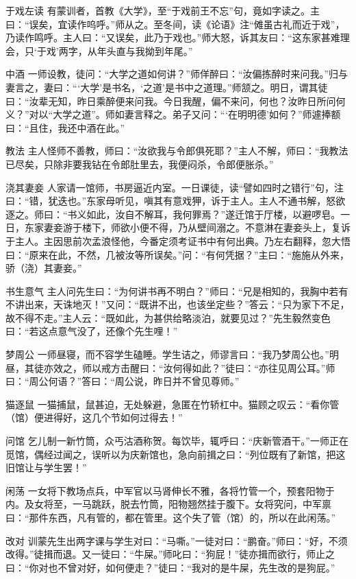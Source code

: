 \documentclass[12pt,UTF8]{ctexbook}
\begin{document}
于戏左读
有蒙训者，首教《大学》，至“于戏前王不忘”句，竟如字读之。主曰：“误矣，宜读作呜呼。”师从之。至冬间，读《论语》注“傩虽古礼而近于戏”，乃读作鸣呼。主人曰：“又误矣，此乃于戏也。”师大怒，诉其友曰：“这东家甚难理会，只‘于戏’两字，从年头直与我拗到年尾。”

中酒
一师设教，徒问：“大学之道如何讲？”师佯醉曰：“汝偏拣醉时来问我。”归与妻言之，妻曰：“‘大学’是书名，‘之道’是书中之道理。”师颔之。明日，谓其徒曰：“汝辈无知，昨日乘醉便来问我。今日我醒，偏不来问，何也？汝昨日所问何义？”对以“大学之道”。师如妻言释之。弟子又问：“‘在明明德’如何？”师遽捧额曰：“且住，我还中酒在此。”

教法
主人怪师不善教，师曰：“汝欲我与令郎俱死耶？”主人不解，师曰：“我教法已尽矣，只除非要我钻在令郎肚里去，我便闷杀，令郎便胀杀。”

浇其妻妾
人家请一馆师，书房逼近内室。一日课徒，读“譬如四时之错行”句，注曰：“错，犹迭也。”东家母听见，嗔其有意戏狎，诉于主人。主人不通书解，怒欲逐之。师曰：“书义如此，汝自不解耳，我何罪焉？”遂迁馆于厅楼，以避啰皂。一日，东家妻妾游于楼下，师欲小便不得，乃从壁间溺之。不意淋在妻妾头上，复诉于主人。主因思前次孟浪怪他，今番定须考证书中有何出典。乃左右翻释，忽大悟曰：“原来在此，不然，几被汝等所误矣。”问：“有何凭据？”主曰：“施施从外来，骄（浇）其妻妾。”

书生意气
主人问先生曰：“为何讲书再不明白？”师曰：“兄是相知的，我胸中若有不讲出来，天诛地灭！”又问：“既讲不出，也该坐定些？”答云：“只为家下不足，故不得不走。”主人云：“既如此，为甚供给略淡泊，就要见过？”先生毅然变色曰：“若这点意气没了，还像个先生哩！”

梦周公
一师昼寝，而不容学生磕睡。学生诘之，师谬言曰：“我乃梦周公也。”明昼，其徒亦效之，师以戒方击醒曰：“汝何得如此？”徒曰：“亦往见周公耳。”师曰：“周公何语？”答曰：“周公说，昨日并不曾见尊师。”

猫逐鼠
一猫捕鼠，鼠甚迫，无处躲避，急匿在竹轿杠中。猫顾之叹云：“看你管（馆）便进得好，这几个节如何过得去！”

问馆
乞儿制一新竹筒，众丐沽酒称贺。每饮毕，辄呼曰：“庆新管酒干。”一师正在觅馆，偶经过闻之，误听以为庆新馆也，急向前揖之曰：“列位既有了新馆，把这旧馆让与学生罢！”

闲荡
一女将下教场点兵，中军官以马肾伸长不雅，各将竹管一个，预套阳物于内。及女将至，一马跳跃，脱去竹筒，阳物翘然挂于腹下。女将究问，中军禀曰：“那件东西，凡有管的，都在管里。这个失了管（馆）的，所以在此闲荡。”

改对
训蒙先生出两字课与学生对曰：“马嘶。”一徒对曰：“鹏奋。”师曰：“好，不须改得。”徒揖而退。又一徒曰：“牛屎。”师叱曰：“狗屁！”徒亦揖而欲行，师止之曰：“你对也不曾对好，如何便走？”徒曰：“我对的是牛屎，先生改的是狗屁。”
\end{document}

